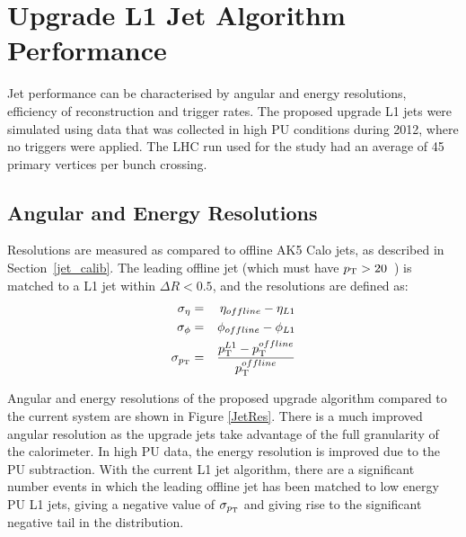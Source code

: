\section{Upgrade L1 Jet Algorithm Performance}
Jet performance can be characterised by angular and energy resolutions, efficiency of reconstruction and trigger rates. The proposed upgrade \ac{L1} jets were simulated using data that was collected in high \ac{PU} conditions during 2012, where no triggers were applied. The \ac{LHC} run used for the study had an average of 45 primary vertices per bunch crossing.  

\subsection{Angular and Energy Resolutions}

Resolutions are measured as compared to offline AK5 Calo jets, as described in Section~\ref{jet_calib}. 
The leading offline jet (which must have $p_{\text{T}} > 20$~\GeV) is matched to a L1 jet within $\Delta R < 0.5$, and the resolutions are defined as:
\begin{eqnarray}
\sigma_{\eta} &=& \eta_{offline} - \eta_{L1} \\
\sigma_{\phi} &=& \phi_{offline} - \phi_{L1}\\
\sigma_{p_{\text{T}}} &=& \frac{ p_{\text{T}}^{L1} - p_{\text{T}}^{offline} } { p_{\text{T}}^{offline} } 
\end{eqnarray}  

Angular and energy resolutions of the proposed upgrade algorithm compared to the current system are shown in Figure \ref{JetRes}.
There is a much improved angular resolution as the upgrade jets take advantage of the full granularity of the calorimeter. In high PU data, the energy resolution is improved due to the PU subtraction. 
With the current \ac{L1} jet algorithm, there are a significant number events in which the leading offline jet has been matched to low energy PU L1 jets, giving a negative value of $\sigma_{p_{\text{T}}}$ and giving rise to the significant negative tail in the distribution.


